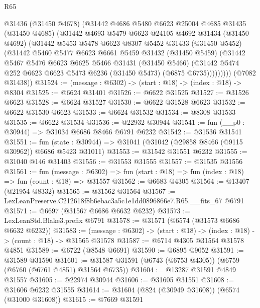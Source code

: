 \begin{lexlean}{R65}
\begin{coremodule}
{          @31436
          (@31450 @4678)
          (@31442
            @4686
            @5480
            @6623
            @25004
            @4685
            @31435
            (@31450 @4685)
            (@31442
              @4693
              @5479
              @6623
              @24105
              @4692
              @31434
              (@31450 @4692)
              (@31442
                @5453
                @5478
                @6623
                @8307
                @5452
                @31433
                (@31450 @5452)
                (@31442
                  @5460
                  @5477
                  @6623
                  @6661
                  @5459
                  @31432
                  (@31450 @5459)
                  (@31442
                    @5467
                    @5476
                    @6623
                    @6625
                    @5466
                    @31431
                    (@31450 @5466)
                    (@31442 @5474 @252 @6623 @6623 @5473 @6236 (@31450 @5473) (@6875 @6735)))))))))
      (@7082 @31438))
@31524 := (message : @6302) -> (start : @18) -> (index : @18) -> @8304
@31525 := @6624 @31401
@31526 := @6622 @31525
@31527 := @31526 @6623
@31528 := @6624 @31527
@31530 := @6622 @31528 @6623
@31532 := @6622 @31530 @6623
@31533 := @6624 @31532
@31534 := @8308 @31533
@31535 := @6622 @31534
@31536 := @22932 @30944
@31541 := fun (__p0 : @30944) => @31034 @6686 @8466 @6791 @6232
@31542 := @31536 @31541
@31551 := fun (state : @30944) => @31041 (@31042 (@29858 @8466 (@9115 @30962)) @6686 @5423 @31011)
@31553 := @31542 @31551 @6232
@31555 := @31040 @146 @31403
@31556 := @31553 @31555
@31557 := @31535 @31556
@31561 := fun (message : @6302) =>
  fun (start : @18) => fun (index : @18) => fun (count : @18) => @31557
@31562 := @6683 @4305
@31564 := @13407 (@21954 @8332)
@31565 := @31562 @31564
@31567 := LexLeanPreserve.C212618f8b6ebac3a5c1e1dd0896866e7.R65.__fits_67 @6791
@31571 := @6697 (@31567 @6686 @6632 @6232)
@31573 := LexLeanStd.Blake3.prefix @6791
@31578 := @31571 (@6574 (@31573 @6686 @6632 @6232))
@31583 := (message : @6302) -> (start : @18) -> (index : @18) -> (count : @18) -> @31565 @31578
@31587 := @6714 @4305 @31564 @31578 @4851
@31589 := @6722 (@8548 @6691)
@31590 := @6895 @9052
@31591 := @31589 @31590
@31601 := @31587 @31591 (@6743 (@6753 @4305)) (@6759 (@6760 (@6761 @4851) @31564 @6735))
@31604 := @13287 @31591 @4849 @31557
@31605 := @22974 @30944
@31606 := @31605 @31551
@31608 := @31606 @6232 @31555
@31614 := @31604 (@824 (@30949 @31608)) (@6574 (@31000 @31608))
@31615 := @7669 @31591
}
\end{coremodule}
\end{lexlean}
